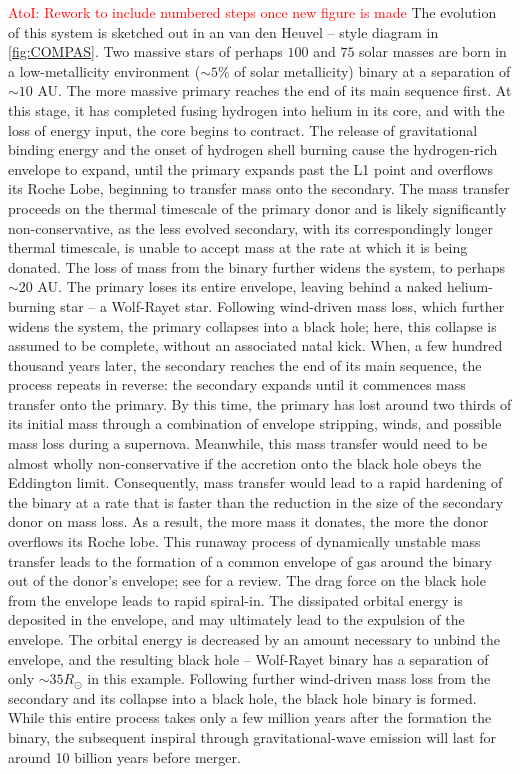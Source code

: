 \documentclass[iop,onecolumn]{revtex4}
\newcommand{\ajf}[1]{\textcolor{red}{AtoI: #1}}
\begin{document}
\ajf{Rework to include numbered steps once new figure is made}
The evolution of this system is sketched out in an van den Heuvel -- style diagram in \autoref{fig:COMPAS}.  Two massive stars of perhaps $100$ and $75$ solar masses are born in a low-metallicity environment ($\sim 5\%$ of solar metallicity)  binary at a separation of $\sim 10$ AU.  The more massive primary reaches the end of its main sequence first.  At this stage, it has completed fusing hydrogen into helium in its core, and with the loss of energy input, the core begins to contract.  The release of gravitational binding energy and the onset of hydrogen shell burning cause the hydrogen-rich envelope to expand, until the primary expands past the L1 point and overflows its Roche Lobe, beginning to transfer mass onto the secondary.  The mass transfer proceeds on the thermal timescale of the primary donor and is likely significantly non-conservative, as the less evolved secondary, with its correspondingly longer thermal timescale, is unable to accept mass at the rate at which it is being donated.  The loss of mass from the binary further widens the system, to perhaps $\sim 20$ AU.  The primary loses its entire envelope, leaving behind a naked helium-burning star -- a Wolf-Rayet star.  Following wind-driven mass loss, which further widens the system, the primary collapses into a black hole; here, this collapse is assumed to be complete, without an associated natal kick.  When, a few hundred thousand years later, the secondary reaches the end of its main sequence, the process repeats in reverse: the secondary expands until it commences mass transfer onto the primary.  By this time, the primary has lost around two thirds of its initial mass through a combination of envelope stripping, winds, and possible mass loss during a supernova.  Meanwhile, this mass transfer would need to be almost wholly non-conservative if the accretion onto the black hole obeys the Eddington limit.  Consequently, mass transfer would lead to a rapid hardening of the binary at a rate that is faster than the reduction in the size of the secondary donor on mass loss.  As a result, the more mass it donates, the more the donor overflows its Roche lobe.  This runaway process of dynamically unstable mass transfer leads to the formation of a common envelope of gas around the binary out of the donor's envelope; see \citet{Ivanova:2013} for a review.  The drag force on the black hole from the envelope leads to rapid spiral-in.   The dissipated orbital energy is deposited in the envelope, and may ultimately lead to the expulsion of the envelope.  The orbital energy is decreased by an amount necessary to unbind the envelope, and the resulting black hole -- Wolf-Rayet binary has a separation of only $\sim 35 R_\odot$ in this example.  Following further wind-driven mass loss from the secondary and its collapse into a black hole, the black hole binary is formed.  While this entire process takes only a few million years after the formation the binary, the subsequent inspiral through gravitational-wave emission will last for around 10 billion years before merger.
\end{document}

